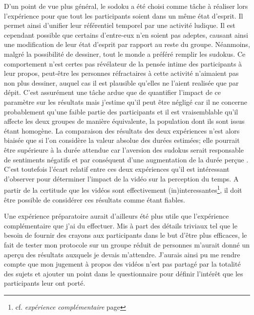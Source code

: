 \documentclass[12pt,fleqn,oneside,french,openany]{book} %
\begin{document}
D'un point de vue plus général, le sodoku a été choisi comme tâche à réaliser lors l'expérience pour que tout les participants soient dans un même état d'esprit. Il permet ainsi d'unifier leur référentiel temporel par une activité ludique. Il est cependant possible que certains d'entre-eux n'en soient pas adeptes, causant ainsi une modification de leur état d'esprit par rapport au reste du groupe. Néanmoins, malgré la possibilité de dessiner, tout le monde a préféré remplir les sudokus. Ce comportement n'est certes pas révélateur de la pensée intime des participants à leur propos, peut-être les personnes réfractaires à cette activité n'aimaient pas non plus dessiner, auquel cas il est plausible qu'elles ne l'aient realisée que par dépit. C'est assurément une tâche ardue que de quantifier l'impact de ce paramètre sur les résultats mais j'estime qu'il peut être négligé car il ne concerne probablement qu'une faible partie des participants et il est vraisemblable qu'il affecte les deux groupes de manière équivalente, la population dont ils sont issus étant homogène. La comparaison des résultats des deux expériences n'est alors biaisée que si l'on considère la valeur absolue des durées estimées; elle pourrait être supérieure à la durée attendue car l'aversion des sudokus serait responsable de sentiments négatifs et par conséquent d'une augmentation de la durée perçue \cite{emotionsTemps,emotionsTemps2}. C'est toutefois l'écart relatif entre ces deux expériences qu'il est intéressant d'observer pour déterminer l'impact de la vidéo sur la perception du temps. A partir de la certitude que les vidéos sont effectivement (in)interessantes\footnote{cf. \emph{expérience complémentaire} page \pageref{ssec:exp1.2}}, il doit être possible de considérer ces résultats comme étant fiables. 

Une expérience préparatoire aurait d'ailleurs été plus utile que l'expérience complémentaire que j'ai du effectuer. Mis à part des détails triviaux tel que le besoin de fournir des crayons aux participants dans le but d'être plus efficaces, le fait de tester mon protocole sur un groupe réduit de personnes m'aurait donné un aperçu des résultats auxquels je devais m'attendre. J'aurais ainsi pu me rendre compte que mon jugement à propos des vidéos n'est pas partagé par la totalité des sujets et ajouter un point dans le questionnaire pour définir l'intérêt que les participants leur ont porté.
\end{document}

